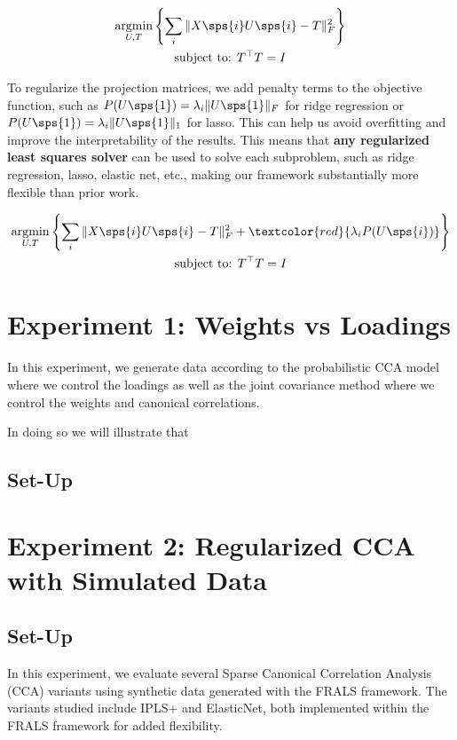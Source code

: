 \begin{gather*}
    \underset{U, T}{\mathrm{argmin}}\left\{\sum_i \|X\sps{i} U\sps{i} - T\|_F^2 \right\}\\
    \text{subject to: } T^\top T = I\\
\end{gather*}

To regularize the projection matrices, we add penalty terms to the objective function, such as \( P(U\sps{1}) = \lambda_i \|U\sps{1}\|_F \) for ridge regression or \( P(U\sps{1}) = \lambda_i \|U\sps{1}\|_1 \) for lasso.
This can help us avoid overfitting and improve the interpretability of the results.
This means that \textbf{any regularized least squares solver} can be used to solve each subproblem, such as ridge regression, lasso, elastic net, etc., making our framework substantially more flexible than prior work.

\begin{gather*}
    \underset{U, T}{\mathrm{argmin}}\left\{\sum_i \|X\sps{i} U\sps{i} - T\|_F^2 + \textcolor{red}{\lambda_i P(U\sps{i})}\right\}\\
    \text{subject to: } T^\top T = I\\
\end{gather*}


\section{Experiment 1: Weights vs Loadings}\label{sec:exp1}

In this experiment, we generate data according to the probabilistic CCA model where we control the loadings as well
as the joint covariance method where we control the weights and canonical correlations.

In doing so we will illustrate that

\subsection{Set-Up}\label{subsec:set-up}




\section{Experiment 2: Regularized CCA with Simulated Data}

\subsection{Set-Up}\label{subsec:set-up}
In this experiment, we evaluate several Sparse Canonical Correlation Analysis (CCA) variants using synthetic data generated with the FRALS framework. The variants studied include IPLS+ and ElasticNet, both implemented within the FRALS framework for added flexibility.

